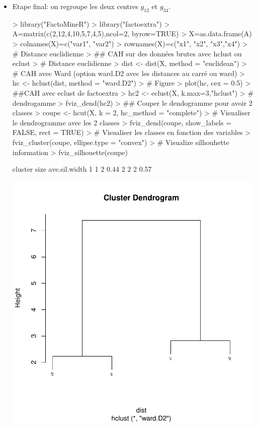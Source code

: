 \documentclass[a4paper]{article}
\begin{document}
\begin{itemize}
\begin{itemize}
\item Etape final: on regroupe les deux centres 
$g_{12}$ et $g_{34}$.
\begin{Schunk}
\begin{Sinput}
> library("FactoMineR")
> library("factoextra")
> A=matrix(c(2,12,4,10,5,7,4,5),ncol=2, byrow=TRUE)
> X=as.data.frame(A)
> colnames(X)=c("var1", "var2")
> rownames(X)=c("x1", "x2", "x3","x4")
> # Distance euclidienne
> ## CAH sur des données brutes avec hclust ou eclust
> # Distance euclidienne
> dist <- dist(X, method = "euclidean")
> # CAH avec Ward (option ward.D2 avec les distances au carré ou ward)
> hc <- hclust(dist, method = "ward.D2")
> # Figure
> plot(hc, cex = 0.5)
> ##CAH avec eclust de factoextra
> hc2 <- eclust(X, k.max=3,"hclust")
> # dendrogamme
> fviz_dend(hc2) 
> ## Couper le dendogramme pour avoir 2 classes
> coupe <- hcut(X, k = 2, hc_method = "complete")
> # Visualiser le dendrogramme avec les 2 classes
> fviz_dend(coupe, show_labels = FALSE, rect = TRUE)
> # Visualiser les classes en fonction des variables
> fviz_cluster(coupe, ellipse.type = "convex")
> # Visualize silhouhette information
> fviz_silhouette(coupe)
\end{Sinput}
\begin{Soutput}
  cluster size ave.sil.width
1       1    2          0.44
2       2    2          0.57
\end{Soutput}
\end{Schunk}
\includegraphics{TP3_M1MAS-003}
\end{itemize}




\end{itemize}
\end{document}
